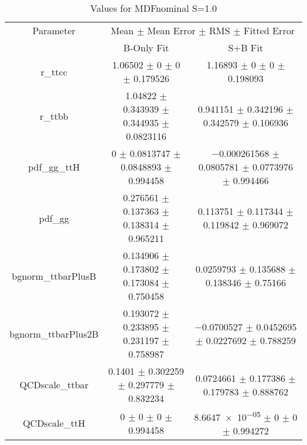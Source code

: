 \begin{table}
\centering
\caption{Values for MDFnominal S=1.0}
\begin{tabular}{ccc}
\toprule
Parameter & \multicolumn{2}{c}{Mean $\pm$ Mean Error $\pm$ RMS $\pm$ Fitted Error}\\
 & B-Only Fit & S+B Fit\\
\midrule
r\_ttcc & \num{1.06502} $\pm$ \num{0} $\pm$ \num{0} $\pm$ \num{0.179526} & \num{1.16893} $\pm$ \num{0} $\pm$ \num{0} $\pm$ \num{0.198093}\\
r\_ttbb & \num{1.04822} $\pm$ \num{0.343939} $\pm$ \num{0.344935} $\pm$ \num{0.0823116} & \num{0.941151} $\pm$ \num{0.342196} $\pm$ \num{0.342579} $\pm$ \num{0.106936}\\
pdf\_gg\_ttH & \num{0} $\pm$ \num{0.0813747} $\pm$ \num{0.0848893} $\pm$ \num{0.994458} & \num{-0.000261568} $\pm$ \num{0.0805781} $\pm$ \num{0.0773976} $\pm$ \num{0.994466}\\
pdf\_gg & \num{0.276561} $\pm$ \num{0.137363} $\pm$ \num{0.138314} $\pm$ \num{0.965211} & \num{0.113751} $\pm$ \num{0.117344} $\pm$ \num{0.119842} $\pm$ \num{0.969072}\\
bgnorm\_ttbarPlusB & \num{0.134906} $\pm$ \num{0.173802} $\pm$ \num{0.173084} $\pm$ \num{0.750458} & \num{0.0259793} $\pm$ \num{0.135688} $\pm$ \num{0.138346} $\pm$ \num{0.75166}\\
bgnorm\_ttbarPlus2B & \num{0.193072} $\pm$ \num{0.233895} $\pm$ \num{0.231197} $\pm$ \num{0.758987} & \num{-0.0700527} $\pm$ \num{0.0452695} $\pm$ \num{0.0227692} $\pm$ \num{0.788259}\\
QCDscale\_ttbar & \num{0.1401} $\pm$ \num{0.302259} $\pm$ \num{0.297779} $\pm$ \num{0.832234} & \num{0.0724661} $\pm$ \num{0.177386} $\pm$ \num{0.179783} $\pm$ \num{0.888762}\\
QCDscale\_ttH & \num{0} $\pm$ \num{0} $\pm$ \num{0} $\pm$ \num{0.994458} & \num{8.6647e-05} $\pm$ \num{0} $\pm$ \num{0} $\pm$ \num{0.994272}\\
\bottomrule
\end{tabular}
\end{table}